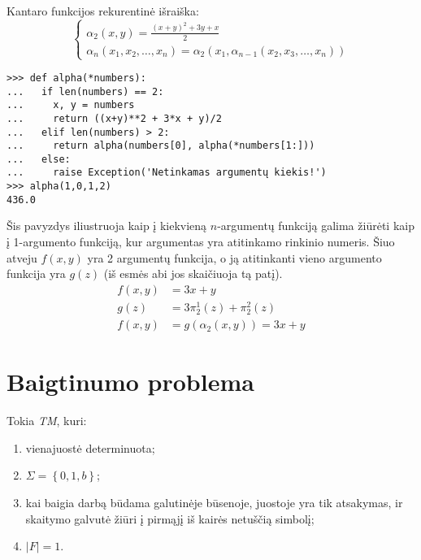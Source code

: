 Kantaro funkcijos rekurentinė išraiška:
\[
\begin{cases}
   \alpha _{2} (x,y) = \frac{(x+y)^{2} + 3y + x}{2} \\
   \alpha _{n} (x_1,x_2,\dotsc,x_n) =%
   \alpha _{2} (x_1, \alpha _{n-1} (x_2,x_3,\dotsc,x_n))
\end{cases}
\]

\begin{note} \hfill
\begin{verbatim}
>>> def alpha(*numbers):
...   if len(numbers) == 2:
...     x, y = numbers
...     return ((x+y)**2 + 3*x + y)/2
...   elif len(numbers) > 2:
...     return alpha(numbers[0], alpha(*numbers[1:]))
...   else:
...     raise Exception('Netinkamas argumentų kiekis!')
>>> alpha(1,0,1,2)
436.0
\end{verbatim}
\end{note}

\begin{exmp}
  Šis pavyzdys iliustruoja kaip į kiekvieną $n$-argumentų funkciją
  galima žiūrėti kaip į 1-argumento funkciją, kur argumentas yra
  atitinkamo rinkinio numeris. Šiuo atveju $f(x,y)$ yra 2 argumentų
  funkcija, o ją atitinkanti vieno argumento funkcija yra $g(z)$ (iš
  esmės abi jos skaičiuoja tą patį).
  \begin{align*}
    f(x,y) &= 3x + y \\
    g(z) &= 3 \pi^{1}_{2}(z) + \pi^{2}_{2}(z) \\
    f(x,y) &= g(\alpha_{2}(x,y)) = 3x + y
  \end{align*}
\end{exmp}

\section{Baigtinumo problema}

\begin{defn}
  Tokia \emph{TM}, kuri:
  \begin{enumerate}
    \item vienajuostė determinuota;
    \item $\Sigma = \left\{ 0, 1, b \right\}$;
    \item kai baigia darbą būdama galutinėje būsenoje, juostoje yra tik
      atsakymas, ir skaitymo galvutė žiūri į pirmąjį iš kairės netuščią
      simbolį;
    \item $|F| = 1$.
  \end{enumerate}
\end{defn}

